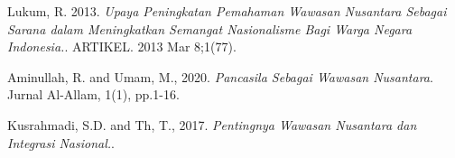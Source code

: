 Lukum, R. 2013. \textit{Upaya Peningkatan Pemahaman Wawasan Nusantara Sebagai Sarana dalam Meningkatkan Semangat Nasionalisme Bagi Warga Negara Indonesia.}. ARTIKEL. 2013 Mar 8;1(77).

Aminullah, R. and Umam, M., 2020. \textit{Pancasila Sebagai Wawasan Nusantara}. Jurnal Al-Allam, 1(1), pp.1-16.

Kusrahmadi, S.D. and Th, T., 2017. \textit{Pentingnya Wawasan Nusantara dan Integrasi Nasional.}.


